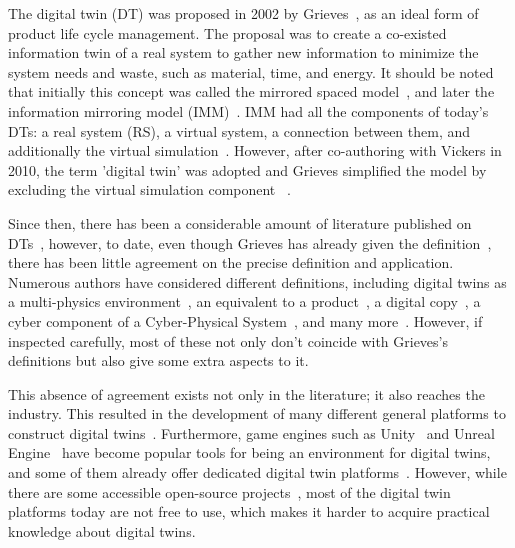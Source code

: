 \documentclass[conference]{IEEEtran}
\begin{document}
    The digital twin (DT) was proposed in 2002 by Grieves~\cite{Originsofdigitaltwinconcept}, as an ideal form of product life cycle management. The proposal was to create a co-existed information twin of 
    a real system to gather new information to minimize the system needs and waste, such as material, time, and energy. It should be noted that initially this concept was called the mirrored spaced model~\cite{Originsofdigitaltwinconcept}, 
    and later the information mirroring model (IMM)~\cite{GrievesPLMBook,2005ArticleGrievesMichael}. IMM had all the components of today's DTs: a real system (RS), a virtual system, 
    a connection between them, and additionally the virtual simulation~\cite{GrievesPLMBook}.
    However, after co-authoring with Vickers in 2010, the term 'digital twin' was adopted and Grieves simplified the model by excluding the virtual simulation component ~\cite{Originsofdigitaltwinconcept}. 
    
    Since then, there has been a considerable amount of literature published on DTs~\cite{Review1,Review2},
    however, to date, even though Grieves has already given the definition~\cite{Originsofdigitaltwinconcept}, there has been little agreement on the precise definition and application. 
    Numerous authors have considered different definitions, including digital twins as a multi-physics environment~\cite{TheDigitalTwinParadigmforFutureNASAandUSAirForceVehicles}, an equivalent to a product~\cite{SCHROEDER201612}, a digital copy~\cite{SODERBERG2017137}, a cyber component of a Cyber-Physical System~\cite{ADigitalTwinArchitectureReferenceModelfortheCloudBasedCyberPhysicalSystems},
    and many more~\cite{Digitaltwindrivenproductdesignframework,ConferenceonNetworking,Thedigitaltwinimplementationforlinkingthevirtualrepresentationof}. 
    However, if inspected carefully, most of these not only don't coincide with Grieves's definitions but also give some extra aspects to it. 
   
    This absence of agreement exists not only in the literature; it also reaches the industry. This resulted in the development of many different 
    general platforms to construct digital twins~\cite{Ansys,DSDIGITALTWIN}. Furthermore, game engines such as Unity~\cite{Unity} and Unreal Engine~\cite{UnrealEngine} have become popular tools for being an 
    environment for digital twins, and some of them already offer dedicated digital twin platforms~\cite{UnityDT,UnrealEngineDT}. 
    However, while there are some accessible open-source projects~\cite{EclipseDitto,iTwin}, most of the digital twin platforms today are not free to use, 
    which makes it harder to acquire practical knowledge about digital twins. 
\end{document}
